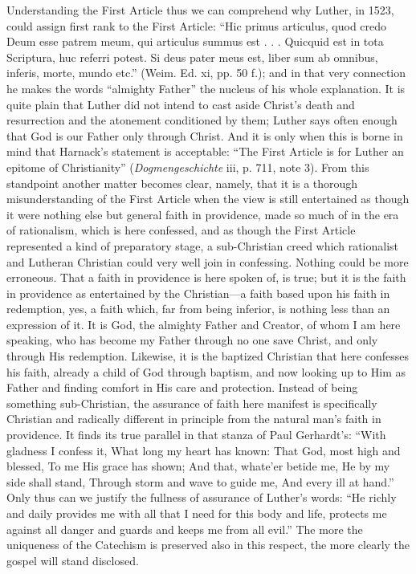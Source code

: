 Understanding the First Article thus we can comprehend why Luther, in 1523, could assign first rank to the First Article: “Hic primus articulus, quod credo Deum esse patrem meum, qui articulus summus est . . . Quicquid est in tota Scriptura, huc referri potest. Si deus pater meus est, liber sum ab omnibus, inferis, morte, mundo etc.” (Weim.
Ed. xi, pp. 50 f.); and in that very connection he makes the words “almighty Father” the nucleus of his whole explanation. It is quite plain that Luther did not intend to cast aside Christ’s death and resurrection and the atonement conditioned by them; Luther says often enough that God is our Father only through Christ. And it is only when this is borne in mind that Harnack’s statement is acceptable: “The First Article is for Luther an epitome of Christianity” (\emph{Dogmengeschichte} iii, p. 711, note 3). From this standpoint another matter becomes clear, namely, that it is a thorough misunderstanding of the First Article when the view is still entertained as though it were nothing else but general faith in providence, made so much of in the era of rationalism, which is here confessed, and as though the First Article represented a kind of preparatory stage, a sub-Christian creed which rationalist and Lutheran Christian could very well join in confessing. Nothing could be more erroneous. That a faith in providence is here spoken of, is true; but it is the faith in providence as entertained by the Christian—a faith based upon his faith in redemption, yes, a faith which, far from being inferior, is nothing less than an expression of it. It is God, the almighty Father and Creator, of whom I am here speaking, who has become my Father through no one save Christ, and only through His redemption. Likewise, it is the baptized Christian that here confesses his faith, already a child of God through baptism, and now looking up to Him as Father and finding comfort in His care and protection. Instead of being something sub-Christian, the assurance of faith here manifest is specifically Christian and radically different in principle from the natural man’s faith in providence. It finds its true parallel in that stanza of Paul Gerhardt’s: “With gladness I confess it, What long my heart has known: That God, most high and blessed, To me His grace has shown; And that, whate’er betide me, He by my side shall stand, Through storm and wave to guide me, And every ill at hand.” Only thus can we justify the fullness of assurance of Luther’s words: “He richly and daily provides me with all that I need for this body and life, protects me against all danger and guards and keeps me from all evil.” The more the uniqueness of the Catechism is preserved also in this respect, the more clearly the gospel will stand disclosed.


